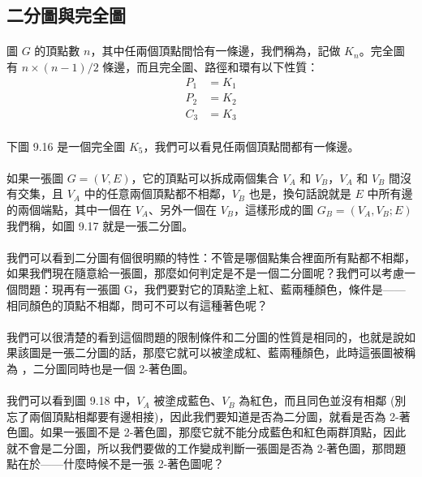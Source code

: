 \documentclass[12pt,a4paper,oneside]{report}
\begin{document}
\begin{CJK}{UTF8}{bkai}
\subsection{二分圖與完全圖}
\paragraph{}圖 $G$ 的頂點數 $n$，其中任兩個頂點間恰有一條邊，我們稱為，記做 $K_n$。完全圖有 $n\times{(n-1)}/2$ 條邊，而且完全圖、路徑和環有以下性質：
\begin{align}
\label{eq:complete_graph}
P_1&=K_1\\
P_2&=K_2\\
C_3&=K_3
\end{align}
\paragraph{}下圖 9.16 是一個完全圖 $K_5$，我們可以看見任兩個頂點間都有一條邊。
\paragraph{}如果一張圖 $G=(V,E)$，它的頂點可以拆成兩個集合 $V_A$ 和 $V_B$，$V_A$ 和 $V_B$ 間沒有交集，且 $V_A$ 中的任意兩個頂點都不相鄰，$V_B$ 也是，換句話說就是 $E$ 中所有邊的兩個端點，其中一個在 $V_A$、另外一個在 $V_B$，這樣形成的圖 $G_B=(V_A,V_B;E)$ 我們稱\textbf{}，如圖 9.17 就是一張二分圖。
\paragraph{}我們可以看到二分圖有個很明顯的特性：不管是哪個點集合裡面所有點都不相鄰，如果我們現在隨意給一張圖，那麼如何判定是不是一個二分圖呢？我們可以考慮一個問題：現再有一張圖 G，我們要對它的頂點塗上紅、藍兩種顏色，條件是------相同顏色的頂點不相鄰，問可不可以有這種著色呢？
\paragraph{}我們可以很清楚的看到這個問題的限制條件和二分圖的性質是相同的，也就是說如果該圖是一張二分圖的話，那麼它就可以被塗成紅、藍兩種顏色，此時這張圖被稱為 \textbf{}，二分圖同時也是一個 2-著色圖。
\paragraph{}我們可以看到圖 9.18 中，$V_A$ 被塗成藍色、$V_B$ 為紅色，而且同色並沒有相鄰 (別忘了兩個頂點相鄰要有邊相接)，因此我們要知道是否為二分圖，就看是否為 2-著色圖。如果一張圖不是 2-著色圖，那麼它就不能分成藍色和紅色兩群頂點，因此就不會是二分圖，所以我們要做的工作變成判斷一張圖是否為 2-著色圖，那問題點在於------什麼時候不是一張 2-著色圖呢？

\end{CJK}
\end{document}
